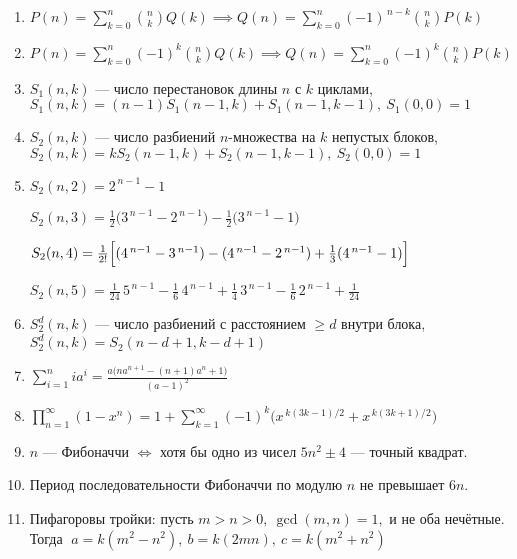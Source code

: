 \documentclass[9pt,a4paper,landscape,twosided]{extarticle}
\begin{document}
\begin{multicols*}{3}
\begin{enumerate}
\item %
$P(n)=\sum_{k=0}^{n}\binom{n}{k}Q(k) \implies Q(n)=\sum_{k=0}^{n}(-1)^{\,n-k}\binom{n}{k}P(k)$

\item %
$P(n)=\sum_{k=0}^{n}(-1)^k\binom{n}{k}Q(k) \implies Q(n)=\sum_{k=0}^{n}(-1)^k\binom{n}{k}P(k)$

\item %
$S_1(n,k)$ — число перестановок длины $n$ с $k$ циклами,
$S_1(n,k)=(n-1)S_1(n-1,k)+S_1(n-1,k-1),\ S_1(0,0)=1$

\item %
$S_2(n,k)$ — число разбиений $n$-множества на $k$ непустых блоков,
$S_2(n,k)=kS_2(n-1,k)+S_2(n-1,k-1),\ S_2(0,0)=1$

\item %
$S_2(n,2)=2^{\,n-1}-1$

$S_2(n,3)=\tfrac{1}{2}\bigl(3^{\,n-1}-2^{\,n-1}\bigr)-\tfrac{1}{2}\bigl(3^{\,n-1}-1\bigr)$

$S_2(n,4)=\tfrac{1}{2!}\Bigl[(4^{\,n-1}-3^{\,n-1})-(4^{\,n-1}-2^{\,n-1})+\tfrac{1}{3}(4^{\,n-1}-1)\Bigr]$

$S_2(n,5)=\tfrac{1}{24}\,5^{\,n-1}-\tfrac{1}{6}\,4^{\,n-1}
+\tfrac{1}{4}\,3^{\,n-1}-\tfrac{1}{6}\,2^{\,n-1}+\tfrac{1}{24}$

\item %
$S_2^d(n,k)$ — число разбиений с расстоянием $\ge d$ внутри блока,
$S_2^d(n,k)=S_2(n-d+1,k-d+1)$

\item %
$\sum_{i=1}^n i a^i=\frac{a\bigl(n a^{n+1}-(n+1)a^n+1\bigr)}{(a-1)^2}$

\item %
$\prod_{n=1}^\infty(1-x^n)=1+\sum_{k=1}^{\infty}(-1)^k\bigl(x^{\,k(3k-1)/2}+x^{\,k(3k+1)/2}\bigr)$

\item %
$n$ — Фибоначчи $\iff$ хотя бы одно из чисел $5n^2\pm4$ — точный квадрат.

\item %
Период последовательности Фибоначчи по модулю $n$ не превышает $6n$.

\item %
Пифагоровы тройки: пусть $m>n>0,\ \gcd(m,n)=1,$ и не оба нечётные. Тогда
$\;a=k(m^2-n^2),\ b=k(2mn),\ c=k(m^2+n^2)$



\end{enumerate}
\end{multicols*}
\end{document}
